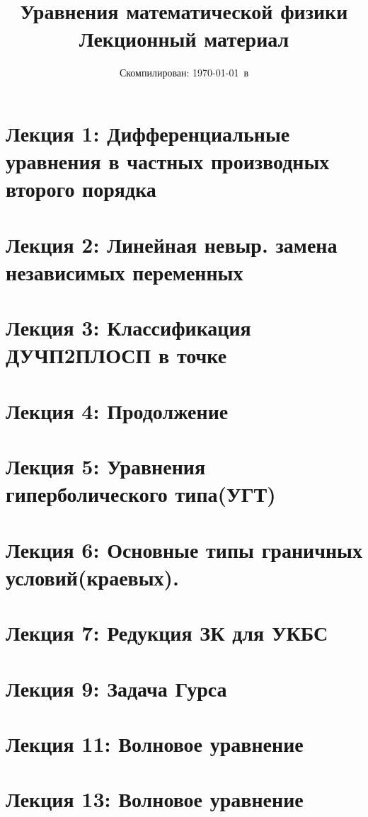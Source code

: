 \documentclass[a4paper,12pt]{extarticle}
\date{Скомпилирован: \today\ в \currenttime \\ \compilerinfo}
\begin{document}
\title{Уравнения математической физики\\Лекционный материал}
\maketitle

\tableofcontents
\break

\section{Лекция 1: Дифференциальные уравнения в частных производных второго порядка}


\section{Лекция 2: Линейная невыр. замена независимых переменных}


\section{Лекция 3: Классификация ДУЧП2ПЛОСП в точке}


\section{Лекция 4: Продолжение}


\section{Лекция 5: Уравнения гиперболического типа(УГТ)}


\section{Лекция 6: Основные типы граничных условий(краевых).}


\section{Лекция 7: Редукция ЗК для УКБС}


\section{Лекция 9: Задача Гурса}


\section{Лекция 11: Волновое уравнение}


\section{Лекция 13: Волновое уравнение}

\end{document}
